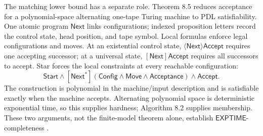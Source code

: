 The matching lower bound has a separate role.  Theorem 8.5 reduces acceptance
for a polynomial-space alternating one-tape Turing machine to PDL
satisfiability.  One atomic program \(\mathsf{Next}\) links configurations;
indexed proposition letters record the control state, head position, and tape
symbol.  Local formulas enforce legal configurations and moves.  At an
existential control state, \(\langle\mathsf{Next}\rangle\mathsf{Accept}\)
requires one accepting successor; at a universal state,
\([\mathsf{Next}]\mathsf{Accept}\) requires all successors to accept.  Star
forces the local constraints at every reachable configuration:
\[
 \mathsf{Start}
 \land[\mathsf{Next}^{*}]
   (\mathsf{Config}\land\mathsf{Move}\land\mathsf{Acceptance})
 \land\mathsf{Accept}.
\]
The construction is polynomial in the machine/input description and is
satisfiable exactly when the machine accepts.  Alternating polynomial space is
deterministic exponential time, so this supplies hardness; Algorithm 8.2
supplies membership.  These two arguments, not the finite-model theorem alone,
establish \(\mathsf{EXPTIME}\)-completeness
\cite[\S8.2]{HarelKozenTiuryn2000}.

